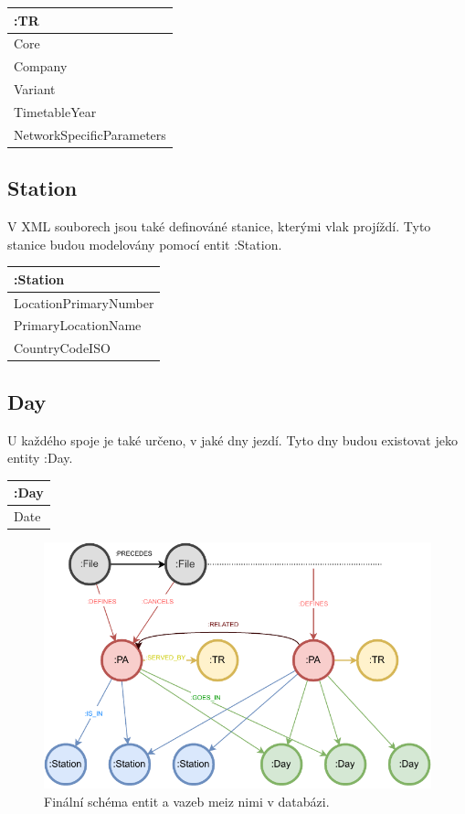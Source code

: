\documentclass[10pt,xcolor=pdflatex,dvipsnames,table,oneside]{book}
\begin{document}
\vspace{1em}
\begin{tabular}{|l|}
    \hline
    :TR \\
    \hline
    Core \\
    Company \\
    Variant \\
    TimetableYear \\
    NetworkSpecificParameters \\
    \hline
\end{tabular}

\subsection{Station}
V XML souborech jsou také definováné stanice, kterými vlak projíždí. Tyto stanice budou modelovány pomocí
entit :Station.

\vspace{1em}
\begin{tabular}{|l|}
    \hline
    :Station \\
    \hline
    LocationPrimaryNumber \\
    PrimaryLocationName \\
    CountryCodeISO \\
    \hline
\end{tabular}

\subsection{Day}
U každého spoje je také určeno, v jaké dny jezdí. Tyto dny budou existovat jeko entity :Day.

\vspace{1em}
\begin{tabular}{|l|}
    \hline
    :Day \\
    \hline
    Date \\
    \hline
\end{tabular}

\begin{figure}
    \includegraphics[width=1\textwidth, angle=0]{img/structure.pdf}
    \caption{Finální schéma entit a vazeb meiz nimi v databázi.}
\end{figure}
\end{document}
